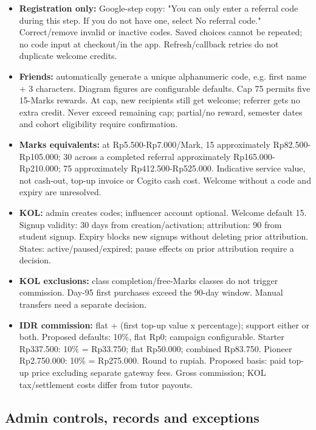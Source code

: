 \documentclass[11pt,a4paper]{article}
\begin{document}
\begin{itemize}
\item \textbf{Registration only:} Google-step copy: "You can only enter a referral code during this step. If you do not have one, select No referral code." Correct/\allowbreak{}remove invalid or inactive codes. Saved choices cannot be repeated; no code input at checkout/\allowbreak{}in the app. Refresh/\allowbreak{}callback retries do not duplicate welcome credits.
\item \textbf{Friends:} automatically generate a unique alphanumeric code, e.g. first name + 3 characters. Diagram figures are configurable defaults. Cap 75 permits five 15-Marks rewards. At cap, new recipients still get welcome; referrer gets no extra credit. Never exceed remaining cap; partial/\allowbreak{}no reward, semester dates and cohort eligibility require confirmation.
\item \textbf{Marks equivalents:} at Rp5.500-Rp7.000/\allowbreak{}Mark, 15 approximately  Rp82.500-Rp105.000; 30 across a completed referral approximately  Rp165.000-Rp210.000; 75 approximately  Rp412.500-Rp525.000. Indicative service value, not cash-out, top-up invoice or Cogito cash cost. Welcome without a code and expiry are unresolved.
\item \textbf{KOL:} admin creates codes; influencer account optional. Welcome default 15. Signup validity: 30 days from creation/\allowbreak{}activation; attribution: 90 from student signup. Expiry blocks new signups without deleting prior attribution. States: active/\allowbreak{}paused/\allowbreak{}expired; pause effects on prior attribution require a decision.
\item \textbf{KOL exclusions:} class completion/\allowbreak{}free-Marks classes do not trigger commission. Day-95 first purchases exceed the 90-day window. Manual transfers need a separate decision.
\item \textbf{IDR commission:} flat + (first top-up value  x  percentage); support either or both. Proposed defaults: 10\%, flat Rp0; campaign configurable. Starter Rp337.500: 10\% = Rp33.750; flat Rp50.000; combined Rp83.750. Pioneer Rp2.750.000: 10\% = Rp275.000. Round to rupiah. Proposed basis: paid top-up price excluding separate gateway fees. Gross commission; KOL tax/\allowbreak{}settlement costs differ from tutor payouts.
\end{itemize}

\subsection*{Admin controls, records and exceptions}
\end{document}

